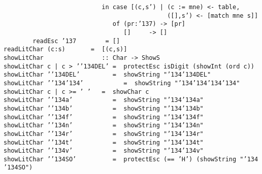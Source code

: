 \mbox{\tt \ \ \ \ \ \ \ \ \ \ \ \ \ \ \ \ \ \ \ \ \ \ \ \ \ \ \ in\ case\ [(c,s')\ |\ (c\ :=\ mne)\ <-\ table,}\\
\mbox{\tt \ \ \ \ \ \ \ \ \ \ \ \ \ \ \ \ \ \ \ \ \ \ \ \ \ \ \ \ \ \ \ \ \ \ \ \ \ \ \ \ \ \ \ \ \ ([],s')\ <-\ [match\ mne\ s]]}\\
\mbox{\tt \ \ \ \ \ \ \ \ \ \ \ \ \ \ \ \ \ \ \ \ \ \ \ \ \ \ \ \ \ \ of\ (pr:{\char'137})\ ->\ [pr]}\\
\mbox{\tt \ \ \ \ \ \ \ \ \ \ \ \ \ \ \ \ \ \ \ \ \ \ \ \ \ \ \ \ \ \ \ \ \ []\ \ \ \ \ ->\ []}\\
\mbox{\tt \ \ \ \ \ \ \ \ readEsc\ {\char'137}\ \ \ \ \ \ \ \ =\ []}\\
\mbox{\tt readLitChar\ (c:s)\ \ \ \ \ \ \ =\ \ [(c,s)]}
%
\eprogB\noindent\bprogB
\mbox{\tt showLitChar\ \ \ \ \ \ \ \ \ \ \ \ \ \ \ \ ::\ Char\ ->\ ShowS}\\
\mbox{\tt showLitChar\ c\ |\ c\ >\ '{\char'134}DEL'\ =\ \ protectEsc\ isDigit\ (showInt\ (ord\ c))}\\
\mbox{\tt showLitChar\ '{\char'134}DEL'\ \ \ \ \ \ \ \ \ =\ \ showString\ "{\char'134}{\char'134}DEL"}\\
\mbox{\tt showLitChar\ '{\char'134}{\char'134}'\ \ \ \ \ \ \ \ \ \ \ =\ \ showString\ "{\char'134}{\char'134}{\char'134}{\char'134}"}\\
\mbox{\tt showLitChar\ c\ |\ c\ >=\ '\ '\ \ \ =\ \ showChar\ c}\\
\mbox{\tt showLitChar\ '{\char'134}a'\ \ \ \ \ \ \ \ \ \ \ =\ \ showString\ "{\char'134}{\char'134}a"}\\
\mbox{\tt showLitChar\ '{\char'134}b'\ \ \ \ \ \ \ \ \ \ \ =\ \ showString\ "{\char'134}{\char'134}b"}\\
\mbox{\tt showLitChar\ '{\char'134}f'\ \ \ \ \ \ \ \ \ \ \ =\ \ showString\ "{\char'134}{\char'134}f"}\\
\mbox{\tt showLitChar\ '{\char'134}n'\ \ \ \ \ \ \ \ \ \ \ =\ \ showString\ "{\char'134}{\char'134}n"}\\
\mbox{\tt showLitChar\ '{\char'134}r'\ \ \ \ \ \ \ \ \ \ \ =\ \ showString\ "{\char'134}{\char'134}r"}\\
\mbox{\tt showLitChar\ '{\char'134}t'\ \ \ \ \ \ \ \ \ \ \ =\ \ showString\ "{\char'134}{\char'134}t"}\\
\mbox{\tt showLitChar\ '{\char'134}v'\ \ \ \ \ \ \ \ \ \ \ =\ \ showString\ "{\char'134}{\char'134}v"}\\
\mbox{\tt showLitChar\ '{\char'134}SO'\ \ \ \ \ \ \ \ \ \ =\ \ protectEsc\ (==\ 'H')\ (showString\ "{\char'134}{\char'134}SO")}\\
